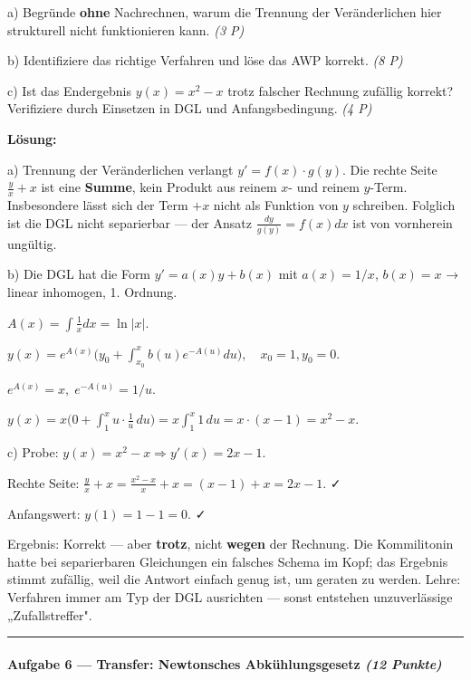 \documentclass[11pt, a4paper]{article}
\begin{document}
a) Begründe \textbf{ohne} Nachrechnen, warum die Trennung der Veränderlichen hier strukturell nicht funktionieren kann. \textit{(3 P)}

b) Identifiziere das richtige Verfahren und löse das AWP korrekt. \textit{(8 P)}

c) Ist das Endergebnis $y(x)=x^2-x$ trotz falscher Rechnung zufällig korrekt? Verifiziere durch Einsetzen in DGL und Anfangsbedingung. \textit{(4 P)}


\textbf{Lösung:}


a) Trennung der Veränderlichen verlangt $y'=f(x)\cdot g(y)$. Die rechte Seite $\frac{y}{x}+x$ ist eine \textbf{Summe}, kein Produkt aus reinem $x$- und reinem $y$-Term. Insbesondere lässt sich der Term $+x$ nicht als Funktion von $y$ schreiben. Folglich ist die DGL nicht separierbar — der Ansatz $\frac{dy}{g(y)}=f(x)dx$ ist von vornherein ungültig.


b) Die DGL hat die Form $y'=a(x)y+b(x)$ mit $a(x)=1/x$, $b(x)=x$ → linear inhomogen, 1. Ordnung.

$A(x)=\int \tfrac{1}{x}dx = \ln|x|.$

$y(x)=e^{A(x)}\Big(y_0+\int_{x_0}^x b(u)e^{-A(u)}du\Big), \quad x_0=1, y_0=0.$

$e^{A(x)}=x,\; e^{-A(u)}=1/u.$

$y(x)=x\Big(0+\int_1^x u\cdot \tfrac{1}{u}\,du\Big)= x\int_1^x 1\,du = x\cdot(x-1)=x^2-x.$


c) Probe: $y(x)=x^2-x \Rightarrow y'(x)=2x-1.$

Rechte Seite: $\frac{y}{x}+x=\frac{x^2-x}{x}+x=(x-1)+x=2x-1.$ ✓

Anfangswert: $y(1)=1-1=0$. ✓

Ergebnis: Korrekt — aber \textbf{trotz}, nicht \textbf{wegen} der Rechnung. Die Kommilitonin hatte bei separierbaren Gleichungen ein falsches Schema im Kopf; das Ergebnis stimmt zufällig, weil die Antwort einfach genug ist, um geraten zu werden. Lehre: Verfahren immer am Typ der DGL ausrichten — sonst entstehen unzuverlässige „Zufallstreffer".



\noindent\textcolor{rulegray}{\rule{\linewidth}{0.4pt}}


\paragraph{Aufgabe 6 — Transfer: Newtonsches Abkühlungsgesetz \textit{(12 Punkte)}}\mbox{}\\[2pt]
\end{document}

